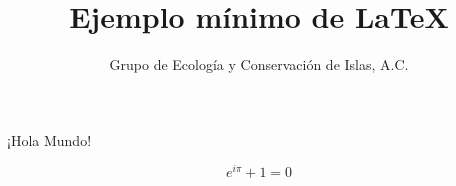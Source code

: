 \documentclass{article}
\begin{document}
\title{Ejemplo mínimo de \LaTeX}
\author{Grupo de Ecología y Conservación de Islas, A.C.}
\maketitle

¡Hola Mundo!

$$ e^{i\pi} + 1 = 0 $$
\end{document}
